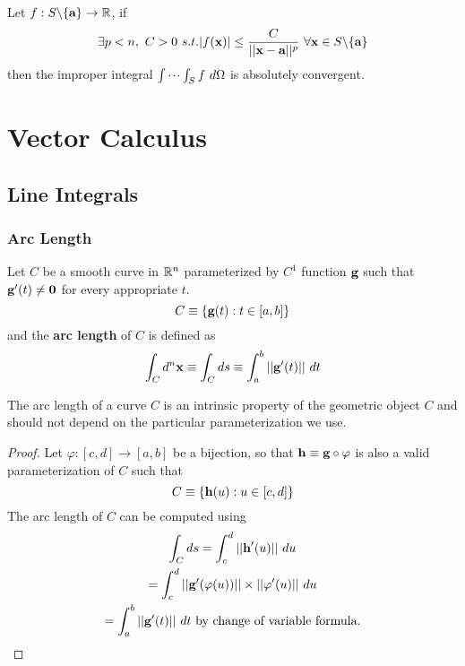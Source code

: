 \documentclass[11pt]{article}
\begin{document}
				\begin{corollary}
					Let $f: S\backslash \{\textbf{a}\} \to \mathbb{R}$, if 
					\begin{equation}
						\exists p < n,\ C > 0\ s.t. |f(\ve{x})| \leq \frac{C}{\norm{\ve{x} - \ve{a}}^p}\ \forall \ve{x} \in S \backslash \{\ve{a}\}
					\end{equation}
					then the improper integral $\idotsint_S f\ d\Omega$ is absolutely convergent.
				\end{corollary}
				
	\section{Vector Calculus}
		\subsection{Line Integrals}
		\subsubsection{Arc Length}
			\begin{definition}
				Let $C$ be a smooth curve in $\mathbb{R}^n$ parameterized by $C^1$ function $\textbf{g}$ such that $\textbf{g}'(t) \neq \textbf{0}$ for every appropriate $t$.
				\begin{equation}
					C \equiv \{\textbf{g}(t): t \in [a, b]\}
				\end{equation}
				and the \textbf{arc length} of $C$ is defined as
				\begin{gather}
					\int_C d^n\textbf{x} \equiv \int_C ds \equiv \int_a^b ||\textbf{g}'(t)||\ dt
				\end{gather}
			\end{definition}
			
			\begin{proposition}
				The arc length of a curve $C$ is an intrinsic property of the geometric object $C$ and should not depend on the particular parameterization we use.
				\begin{proof}
					Let $\varphi:[c,d] \to [a,b]$ be a bijection, so that $\textbf{h} \equiv \textbf{g} \circ \varphi$ is also a valid parameterization of $C$ such that
					\begin{equation}
						C \equiv \{\textbf{h}(u): u \in [c, d]\}
					\end{equation}
					The arc length of $C$ can be computed using
					\begin{gather}
						\int_C ds = \int_c^d ||\textbf{h}'(u)||\ du \\
						= \int_c^d ||\textbf{g}'(\varphi(u))|| \times ||\varphi'(u)||\ du \\
						= \int_a^b ||\textbf{g}'(t)||\ dt \text{{ by change of variable formula.}}
					\end{gather}
				\end{proof}
			\end{proposition}
			
\end{document}

